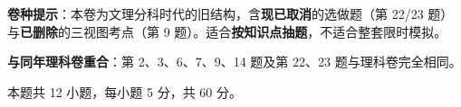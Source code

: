 

\begin{gknotice}
\textbf{ 卷种提示}：本卷为文理分科时代的旧结构，含\textbf{现已取消}的选做题（第 22/23 题）与\textbf{已删除}的三视图考点（第 9 题）。适合\textbf{按知识点抽题}，不适合整套限时模拟。

\textbf{与同年理科卷重合}：第 2、3、6、7、9、14 题及第 22、23 题与理科卷完全相同。
\end{gknotice}

\par\medskip


\begin{gktip}
本题共 12 小题，每小题 5 分，共 60 分。
\end{gktip}

